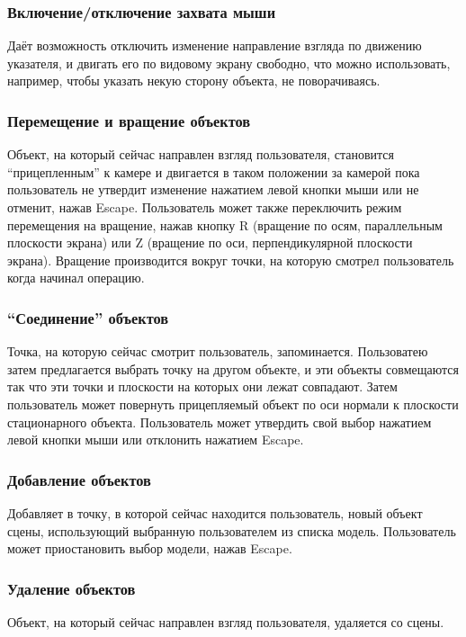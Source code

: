 \documentclass[a4paper,12pt]{report}
\numberwithin{equation}{section}
\begin{document}
\subsubsection{Включение/отключение захвата мыши}
Даёт возможность отключить изменение направление взгляда по движению указателя, и двигать его по видовому экрану свободно, что можно использовать, например, чтобы указать некую сторону объекта, не поворачиваясь.

\subsubsection{Перемещение и вращение объектов}
Объект, на который сейчас направлен взгляд пользователя, становится ``прицепленным'' к камере и двигается в таком положении за камерой пока пользователь не утвердит изменение нажатием левой кнопки мыши или не отменит, нажав Escape. Пользователь может также переключить режим перемещения на вращение, нажав кнопку R (вращение по осям, параллельным плоскости экрана) или Z (вращение по оси, перпендикулярной плоскости экрана). Вращение производится вокруг точки, на которую смотрел пользователь когда начинал операцию.

\subsubsection{``Соединение'' объектов}
Точка, на которую сейчас смотрит пользователь, запоминается. Пользоватею затем предлагается выбрать точку на другом объекте, и эти объекты совмещаются так что эти точки и плоскости на которых они лежат совпадают. Затем пользователь может повернуть прицепляемый объект по оси нормали к плоскости стационарного объекта. Пользователь может утвердить свой выбор нажатием левой кнопки мыши или отклонить нажатием Escape.

\subsubsection{Добавление объектов}
Добавляет в точку, в которой сейчас находится пользователь, новый объект сцены, использующий выбранную пользователем из списка модель. Пользователь может приостановить выбор модели, нажав Escape.

\subsubsection{Удаление объектов}
Объект, на который сейчас направлен взгляд пользователя, удаляется со сцены.
\end{document}
